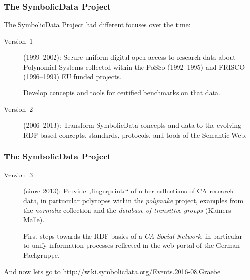 \documentclass{beamer}
\begin{document}
\begin{frame}\frametitle{The SymbolicData Project}

The SymbolicData Project had different focuses over the time:
\begin{description}
\item[Version~1] (1999--2002): Secure uniform digital open access to research
  data about Polynomial Systems collected within the PoSSo (1992--1995) and
  FRISCO (1996--1999) EU funded projects. \medskip

  Develop concepts and tools for certified benchmarks on that data.
\item[Version~2] (2006--2013): Transform SymbolicData concepts and data to the
  evolving RDF based concepts, standards, protocols, and tools of the Semantic
  Web.
\end{description}
\end{frame}
\begin{frame}\frametitle{The SymbolicData Project}
\begin{description}
\item[Version~3] (since 2013): Provide „fingerprints“ of other collections of
  CA research data, in partucular polytopes within the \emph{polymake} project,
  examples from the \emph{normaliz} collection and the \emph{database of
    transitive groups} (Kl\"uners, Malle).\medskip

  First steps towards the RDF basics of a \emph{CA Social Network}, in
  particular to unify information processes reflected in the web portal of the
  German Fachgruppe.
\end{description}

And now lets go to \url{http://wiki.symbolicdata.org/Events.2016-08.Graebe}
\end{frame}
\end{document}
